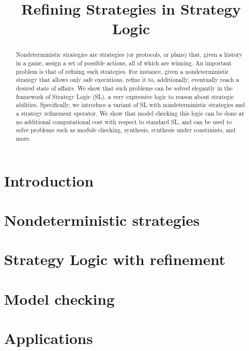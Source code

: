 \documentclass{article}
\title{Refining Strategies in Strategy Logic}
\author{
%
%
%
}
\theoremstyle{definition}
\theoremstyle{plain}
\begin{document}
\maketitle

\begin{abstract}
  Nondeterministic strategies are strategies (or protocols, or plans)
  that, given a history in a game, assign a set of possible actions,
  all of which are winning.  An important problem is that of
  refining such strategies. For instance, given a nondeterministic strategy that allows
only safe executions, 
 refine it to, additionally, eventually reach a desired state of affairs. We show that such problems can
  be solved elegantly in the framework of Strategy Logic (SL), a very
  expressive logic to reason about strategic abilities. Specifically, we
  introduce a variant of SL with nondeterministic strategies 
 and a strategy refinement operator. We 
  show that model checking this logic can be done at 
no additional  computational cost with respect to standard SL, and can
be used to solve problems such as module checking, synthesis,
synthesis under constraints, and more.
\end{abstract}

\section{Introduction}
\label{section:introduction}


\section{Nondeterministic strategies}
\label{section:refinement}





\section{Strategy Logic with refinement}
\label{section:SL}


\section{Model checking \SLref}
\label{section:mc}


\section{Applications}
\label{section:app}




\end{document}
